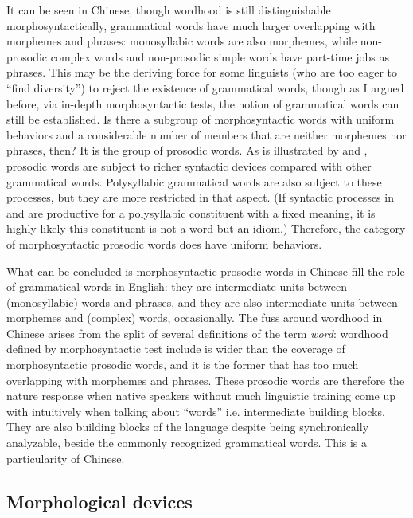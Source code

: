 \documentclass[UTF8, a4paper, oneside, scheme=plain]{ctexart}
\newcommand*{\term}[1]{\emph{#1}}
\begin{document}
It can be seen in Chinese, 
though wordhood is still distinguishable morphosyntactically,
grammatical words have much larger overlapping with morphemes and phrases: 
monosyllabic words are also morphemes, 
while non-prosodic complex words and non-prosodic simple words have part-time jobs as phrases.
This may be the deriving force for some linguists 
(who are too eager to ``find diversity'')
to reject the existence of grammatical words,
though as I argued before,
via in-depth morphosyntactic tests,
the notion of grammatical words can still be established.
Is there a subgroup of morphosyntactic words 
with uniform behaviors and 
a considerable number of members that are neither morphemes nor phrases, then?
It is the group of prosodic words.
As is illustrated by  and ,
prosodic words are subject to richer syntactic devices 
compared with other grammatical words.
Polysyllabic grammatical words are also subject to these processes,
but they are more restricted in that aspect.
(If syntactic processes in  and 
are productive for a polysyllabic constituent with a fixed meaning,
it is highly likely this constituent is not a word but an idiom.)
Therefore, the category of morphosyntactic prosodic words does have uniform behaviors.

What can be concluded is 
morphosyntactic prosodic words in Chinese 
fill the role of grammatical words in English:
they are intermediate units between (monosyllabic) words and phrases,
and they are also intermediate units between morphemes and (complex) words,
occasionally.
The fuss around wordhood in Chinese 
arises from the split of several definitions of the term \term{word}:
wordhood defined by morphosyntactic test include is wider 
than the coverage of morphosyntactic prosodic words,
and it is the former that has too much overlapping with morphemes and phrases.
These prosodic words are therefore the nature response 
when native speakers without much linguistic training 
come up with intuitively when talking about ``words''
i.e. intermediate building blocks.
They are also building blocks of the language
despite being synchronically analyzable,
beside the commonly recognized grammatical words. 
This is a particularity of Chinese.

\subsection{Morphological devices}\label{sec:morphological-device}
\end{document}
